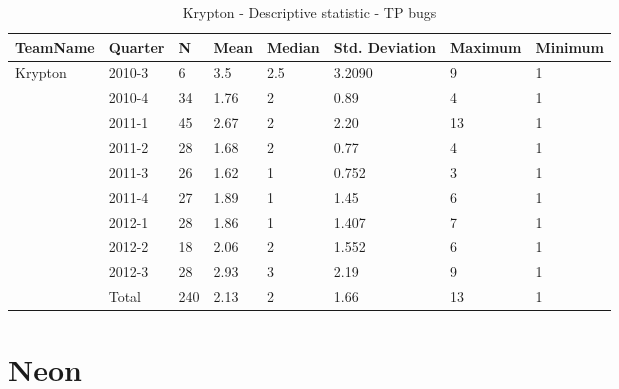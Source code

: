 \documentclass[UKenglish]{ifimaster}  %
\begin{document}
\begin{table}[!htbp]
\begin{tabular}{ | l | l | l | l | l | l | l | l | }
\hline
TeamName & Quarter & N & Mean & Median & Std. Deviation & Maximum & Minimum \\ \hline
	Krypton & 2010-3 & 6 & 3.5 & 2.5 & 3.2090& 9 & 1 \\ \hline
	 & 2010-4 & 34 & 1.76 & 2 & 0.89 & 4 & 1 \\ \hline
	 & 2011-1 & 45 & 2.67 & 2 & 2.20 & 13 & 1 \\ \hline
	 & 2011-2 & 28 & 1.68 & 2 & 0.77& 4 & 1 \\ \hline
	 & 2011-3 & 26 & 1.62 & 1 & 0.752 & 3 & 1 \\ \hline
	 & 2011-4 & 27 & 1.89 & 1 & 1.45 & 6 & 1 \\ \hline
	 & 2012-1 & 28 & 1.86 & 1 & 1.407 & 7 & 1 \\ \hline
	 & 2012-2 & 18 & 2.06 & 2 & 1.552 & 6 & 1 \\ \hline
	 & 2012-3 & 28 & 2.93 & 3 & 2.19 & 9 & 1 \\ \hline
	 & Total & 240 & 2.13 & 2 & 1.66 & 13 & 1 \\ \hline
\end{tabular}
\caption{Krypton - Descriptive statistic  - TP bugs}
\end{table}


\section{Neon}
\end{document}
